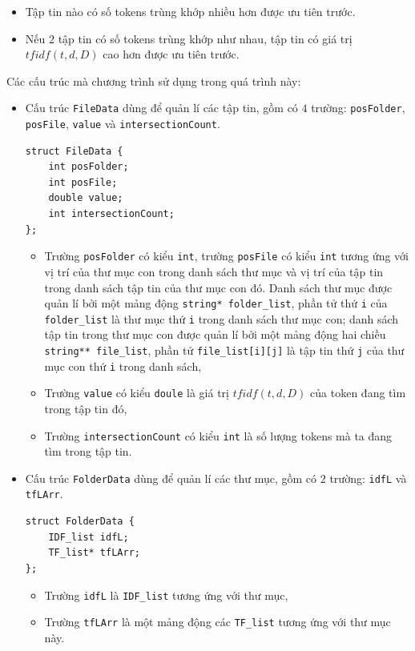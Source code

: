 \documentclass[12pt,a4paper]{article}
\begin{document}
\begin{itemize}
\item Tập tin nào có số tokens trùng khớp nhiều hơn được ưu tiên trước.
\item Nếu \(2\) tập tin có số tokens trùng khớp như nhau, tập tin có giá trị \(tfidf\left( {t,d,D} \right)\) cao hơn được ưu tiên trước.
\end{itemize}
Các cấu trúc mà chương trình sử dụng trong quá trình này:
\begin{itemize}
\item Cấu trúc \lstinline{FileData} dùng để quản lí các tập tin, gồm có \(4\) trường: \lstinline{posFolder}, \lstinline{posFile}, \lstinline{value} và \lstinline{intersectionCount}. 
\begin{lstlisting}
struct FileData {
	int posFolder;
	int posFile;
	double value;
	int intersectionCount;
};
\end{lstlisting}
\begin{itemize}
\item Trường \lstinline{posFolder} có kiểu \lstinline{int}, trường \lstinline{posFile} có kiểu \lstinline{int} tương ứng với vị trí của thư mục con trong danh sách thư mục và vị trí của tập tin trong danh sách tập tin của thư mục con đó. Danh sách thư mục được quản lí bởi một mảng động \lstinline{string* folder_list}, phần tử thứ \lstinline{i} của \lstinline{folder_list} là thư mục thứ \lstinline{i} trong danh sách thư mục con; danh sách tập tin trong thư mục con được quản lí bởi một mảng động hai chiều \lstinline{string** file_list}, phần tử \lstinline{file_list[i][j]} là tập tin thứ \lstinline{j} của thư mục con thứ \lstinline{i} trong danh sách,
\item Trường \lstinline{value} có kiểu \lstinline{doule} là giá trị \(tfidf\left( {t,d,D} \right)\) của token đang tìm trong tập tin đó,
\item Trường \lstinline{intersectionCount} có kiểu \lstinline{int} là số lượng tokens mà ta đang tìm trong tập tin. 
\end{itemize}
\item Cấu trúc \lstinline{FolderData} dùng để quản lí các thư mục, gồm có \(2\) trường: \lstinline{idfL} và \lstinline{tfLArr}.
\begin{lstlisting}
struct FolderData {
	IDF_list idfL;
	TF_list* tfLArr;
};
\end{lstlisting}
\begin{itemize}
\item Trường \lstinline{idfL} là \lstinline{IDF_list} tương ứng với thư mục,
 \item Trường \lstinline{tfLArr} là một mảng động các \lstinline{TF_list} tương ứng với thư mục này.

\end{itemize}
\end{itemize}
\end{document}
